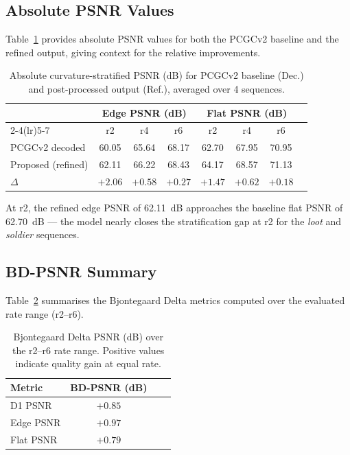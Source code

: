 \subsection{Absolute PSNR Values}

Table~\ref{tab:absolute-psnr-results} provides absolute PSNR values for both the
PCGCv2 baseline and the refined output, giving context for the relative
improvements.

\begin{table}[t]
  \centering
  \caption{%
    Absolute curvature-stratified PSNR (dB) for PCGCv2 baseline (Dec.) and
    post-processed output (Ref.), averaged over 4 sequences.
  }
  \label{tab:absolute-psnr-results}
  \small
  \begin{tabular}{lccccccc}
    \toprule
    & \multicolumn{3}{c}{Edge PSNR (dB)} & \multicolumn{3}{c}{Flat PSNR (dB)} \\
    \cmidrule(lr){2-4}\cmidrule(lr){5-7}
    & r2 & r4 & r6 & r2 & r4 & r6 \\
    \midrule
    PCGCv2 decoded & 60.05 & 65.64 & 68.17 & 62.70 & 67.95 & 70.95 \\
    Proposed (refined) & 62.11 & 66.22 & 68.43 & 64.17 & 68.57 & 71.13 \\
    \midrule
    $\Delta$ & $+2.06$ & $+0.58$ & $+0.27$ & $+1.47$ & $+0.62$ & $+0.18$ \\
    \bottomrule
  \end{tabular}
\end{table}

At r2, the refined edge PSNR of 62.11~dB approaches the baseline flat PSNR
of 62.70~dB --- the model nearly closes the stratification gap at r2
for the \textit{loot} and \textit{soldier} sequences.

\subsection{BD-PSNR Summary}

Table~\ref{tab:bd-psnr} summarises the Bjontegaard Delta metrics computed
over the evaluated rate range (r2--r6).

\begin{table}[t]
  \centering
  \caption{%
    Bjontegaard Delta PSNR (dB) over the r2--r6 rate range.
    Positive values indicate quality gain at equal rate.
  }
  \label{tab:bd-psnr}
  \begin{tabular}{lccc}
    \toprule
    Metric & BD-PSNR (dB) \\
    \midrule
    D1 PSNR    & $+0.85$ \\
    Edge PSNR  & $+0.97$ \\
    Flat PSNR  & $+0.79$ \\
    \bottomrule
  \end{tabular}
\end{table}

